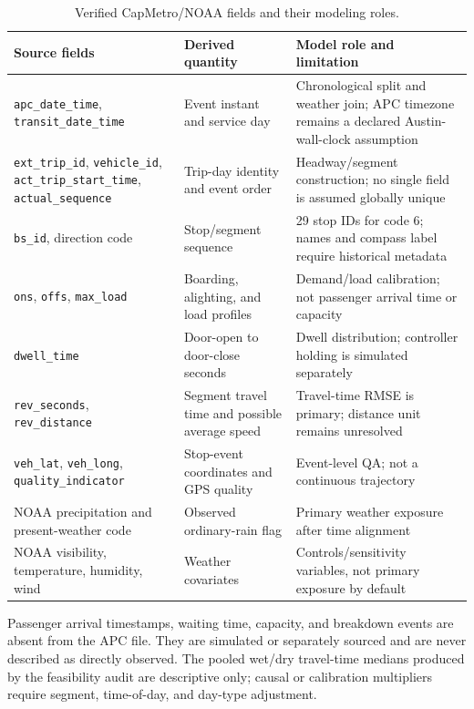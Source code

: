 \begin{table}[htbp]
\centering
\caption{Verified CapMetro/NOAA fields and their modeling roles.}
\label{tab:field-mapping-texas}
\small
\renewcommand{\arraystretch}{1.2}
\begin{tabularx}{\textwidth}{p{}p{}X}
\toprule
\textbf{Source fields} & \textbf{Derived quantity} & \textbf{Model role and limitation} \\
\midrule
\texttt{apc\_date\_time}, \texttt{transit\_date\_time} & Event instant and service day & Chronological split and weather join; APC timezone remains a declared Austin-wall-clock assumption \\
\texttt{ext\_trip\_id}, \texttt{vehicle\_id}, \texttt{act\_trip\_start\_time}, \texttt{actual\_sequence} & Trip-day identity and event order & Headway/segment construction; no single field is assumed globally unique \\
\texttt{bs\_id}, direction code & Stop/segment sequence & 29 stop IDs for code 6; names and compass label require historical metadata \\
\texttt{ons}, \texttt{offs}, \texttt{max\_load} & Boarding, alighting, and load profiles & Demand/load calibration; not passenger arrival time or capacity \\
\texttt{dwell\_time} & Door-open to door-close seconds & Dwell distribution; controller holding is simulated separately \\
\texttt{rev\_seconds}, \texttt{rev\_distance} & Segment travel time and possible average speed & Travel-time RMSE is primary; distance unit remains unresolved \\
\texttt{veh\_lat}, \texttt{veh\_long}, \texttt{quality\_indicator} & Stop-event coordinates and GPS quality & Event-level QA; not a continuous trajectory \\
NOAA precipitation and present-weather code & Observed ordinary-rain flag & Primary weather exposure after time alignment \\
NOAA visibility, temperature, humidity, wind & Weather covariates & Controls/sensitivity variables, not primary exposure by default \\
\bottomrule
\end{tabularx}
\end{table}

Passenger arrival timestamps, waiting time, capacity, and breakdown events are absent from the APC file. They are simulated or separately sourced and are never described as directly observed. The pooled wet/dry travel-time medians produced by the feasibility audit are descriptive only; causal or calibration multipliers require segment, time-of-day, and day-type adjustment.

